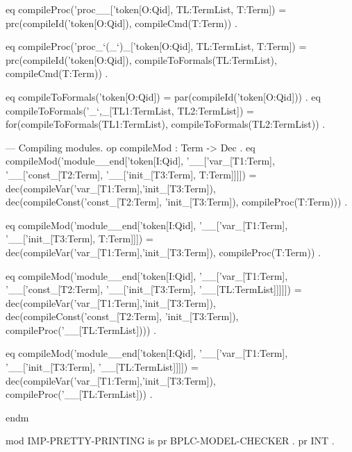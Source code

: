 \documentclass{llncs}%
\begin{document}
        eq compileProc('proc__['token[O:Qid], TL:TermList, T:Term]) =
           prc(compileId('token[O:Qid]), compileCmd(T:Term)) .

        eq compileProc('proc_`(_`)_['token[O:Qid], TL:TermList, T:Term]) =
           prc(compileId('token[O:Qid]),
           compileToFormals(TL:TermList), compileCmd(T:Term)) .

    eq compileToFormals('token[O:Qid]) = par(compileId('token[O:Qid])) .
    eq compileToFormals('_`,_[TL1:TermList, TL2:TermList]) =
           for(compileToFormals(TL1:TermList), compileToFormals(TL2:TermList)) .

    --- Compiling modules.
        op compileMod : Term -> Dec .
        eq compileMod('module__end['token[I:Qid],
                        '__['var_[T1:Term],
                                        '__['const_[T2:Term],
                                        '__['init_[T3:Term],
                                        T:Term]]]]) =
           dec(compileVar('var_[T1:Term],'init_[T3:Term]),
            dec(compileConst('const_[T2:Term], 'init_[T3:Term]),
                 compileProc(T:Term))) .

        eq compileMod('module__end['token[I:Qid],
                        '__['var_[T1:Term],
                                        '__['init_[T3:Term],
                                        T:Term]]]) =
           dec(compileVar('var_[T1:Term],'init_[T3:Term]),
                 compileProc(T:Term)) .

        eq compileMod('module__end['token[I:Qid],
                        '__['var_[T1:Term],
                                        '__['const_[T2:Term],
                                        '__['init_[T3:Term],
                                        '__[TL:TermList]]]]]) =
           dec(compileVar('var_[T1:Term],'init_[T3:Term]),
            dec(compileConst('const_[T2:Term], 'init_[T3:Term]),
                 compileProc('__[TL:TermList]))) .

        eq compileMod('module__end['token[I:Qid],
                                '__['var_[T1:Term],
                                                '__['init_[T3:Term],
                                                '__[TL:TermList]]]]) =
           dec(compileVar('var_[T1:Term],'init_[T3:Term]),
                 compileProc('__[TL:TermList])) .

endm
\nwendcode{}\nwdocspar

\nwenddocs{}\endmoddef\nwstartdeflinemarkup\nwenddeflinemarkup
mod IMP-PRETTY-PRINTING is
    pr BPLC-MODEL-CHECKER .
        pr INT .
\end{document}
